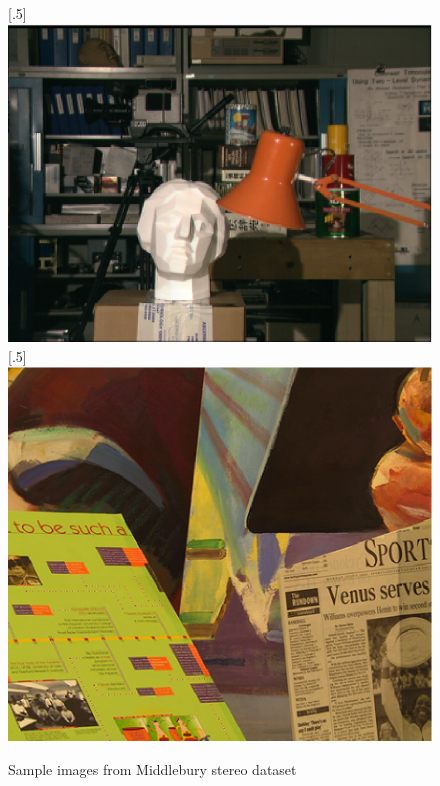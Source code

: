 \begin{figure}[H]
\centering
{}
[.5\linewidth]{\includegraphics[scale=0.5]{tsukubaL}}%
[.5\linewidth]{\includegraphics[scale=0.51]{venusL}}%
\caption{Sample images from Middlebury stereo dataset \protect\cite{midbdata}}
\label{fig:midburyimgs}
\end{figure}


